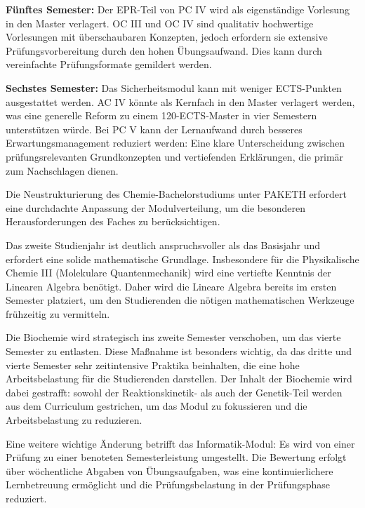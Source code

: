 \documentclass[a4paper]{article}
\begin{document}
\textbf{Fünftes Semester:} Der EPR-Teil von PC IV wird als eigenständige Vorlesung in den Master verlagert. OC III und OC IV sind qualitativ hochwertige Vorlesungen mit überschaubaren Konzepten, jedoch erfordern sie extensive Prüfungsvorbereitung durch den hohen Übungsaufwand. Dies kann durch vereinfachte Prüfungsformate gemildert werden.

\textbf{Sechstes Semester:} Das Sicherheitsmodul kann mit weniger ECTS-Punkten ausgestattet werden. AC IV könnte als Kernfach in den Master verlagert werden, was eine generelle Reform zu einem 120-ECTS-Master in vier Semestern unterstützen würde. Bei PC V kann der Lernaufwand durch besseres Erwartungsmanagement reduziert werden: Eine klare Unterscheidung zwischen prüfungsrelevanten Grundkonzepten und vertiefenden Erklärungen, die primär zum Nachschlagen dienen.

Die Neustrukturierung des Chemie-Bachelorstudiums unter PAKETH erfordert eine durchdachte Anpassung der Modulverteilung, um die besonderen Herausforderungen des Faches zu berücksichtigen.

Das zweite Studienjahr ist deutlich anspruchsvoller als das Basisjahr und erfordert eine solide mathematische Grundlage. Insbesondere für die Physikalische Chemie III (Molekulare Quantenmechanik) wird eine vertiefte Kenntnis der Linearen Algebra benötigt. Daher wird die Lineare Algebra bereits im ersten Semester platziert, um den Studierenden die nötigen mathematischen Werkzeuge frühzeitig zu vermitteln.

Die Biochemie wird strategisch ins zweite Semester verschoben, um das vierte Semester zu entlasten. Diese Maßnahme ist besonders wichtig, da das dritte und vierte Semester sehr zeitintensive Praktika beinhalten, die eine hohe Arbeitsbelastung für die Studierenden darstellen. Der Inhalt der Biochemie wird dabei gestrafft: sowohl der Reaktionskinetik- als auch der Genetik-Teil werden aus dem Curriculum gestrichen, um das Modul zu fokussieren und die Arbeitsbelastung zu reduzieren.

Eine weitere wichtige Änderung betrifft das Informatik-Modul: Es wird von einer Prüfung zu einer benoteten Semesterleistung umgestellt. Die Bewertung erfolgt über wöchentliche Abgaben von Übungsaufgaben, was eine kontinuierlichere Lernbetreuung ermöglicht und die Prüfungsbelastung in der Prüfungsphase reduziert.

\renewcommand{\arraystretch}{1.2}
\end{document}
